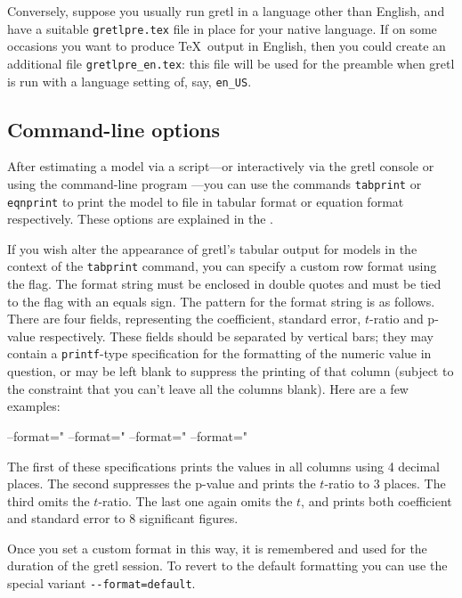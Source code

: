 Conversely, suppose you usually run gretl in a language other
than English, and have a suitable \verb|gretlpre.tex| file in place
for your native language.  If on some occasions you want to produce
\TeX\ output in English, then you could create an additional
file \verb|gretlpre_en.tex|: this file will be used for the preamble
when gretl is run with a language setting of, say,
\verb|en_US|.  


\subsection{Command-line options}

After estimating a model via a script---or interactively via the gretl
console or using the command-line program ---you can use
the commands \texttt{tabprint} or \texttt{eqnprint} to print the model
to file in tabular format or equation format respectively.  These
options are explained in the \GCR{}.

If you wish alter the appearance of gretl's tabular output for
models in the context of the \texttt{tabprint} command, you can
specify a custom row format using the  flag.  The
format string must be enclosed in double quotes and must be tied to
the flag with an equals sign.  The pattern for the format string is as
follows.  There are four fields, representing the coefficient,
standard error, $t$-ratio and p-value respectively.  These fields
should be separated by vertical bars; they may contain a
\texttt{printf}-type specification for the formatting of the numeric
value in question, or may be left blank to suppress the printing of
that column (subject to the constraint that you can't leave all the
columns blank).  Here are a few examples:

\begin{code}
--format="%
--format="%
--format="%
--format="%
\end{code}

The first of these specifications prints the values in all columns
using 4 decimal places.  The second suppresses the p-value and prints
the $t$-ratio to 3 places.  The third omits the $t$-ratio.  The last
one again omits the $t$, and prints both coefficient and standard
error to 8 significant figures.

Once you set a custom format in this way, it is remembered and used
for the duration of the gretl session.  To revert to the default
formatting you can use the special variant \verb|--format=default|.


